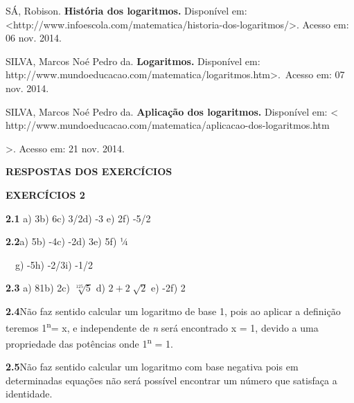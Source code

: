\documentclass[12pt]{article}
\begin{document}
\begin{enumerate}
\setlength{\parskip}{0.0pt}
SÁ, Robison. \textbf{História dos logaritmos. }Disponível em: <http://www.infoescola.com/matematica/historia-dos-logaritmos/>. Acesso em: 06 nov. 2014.\par

SILVA, Marcos Noé Pedro da. \textbf{Logaritmos. }Disponível em: http://www.mundoeducacao.com/matematica/logaritmos.htm>.\  Acesso em: 07 nov. 2014.\par

SILVA, Marcos Noé Pedro da. \textbf{Aplicação dos logaritmos. }Disponível em: < http://www.mundoeducacao.com/matematica/aplicacao-dos-logaritmos.htm\par

>. Acesso em: 21 nov. 2014.\par


\vspace{\baselineskip}
\setlength{\parskip}{8.04pt}

\vspace{\baselineskip}
\textbf{RESPOSTAS DOS EXERCÍCIOS}\par


\vspace{\baselineskip}

\vspace{\baselineskip}
\textbf{EXERCÍCIOS 2}\par

\textbf{2.1 \tab }a) 3\tab \tab b) 6\tab \tab c) 3/2\tab \tab d) -3 \tab \tab e) 2\tab \tab f) -5/2\par

\textbf{2.2\tab }a) 5\tab \tab b) -4\tab \tab c) -2\tab \tab d) 3\tab \tab e) 5\tab \tab f) ¼\par

\ \  \tab g) -5\tab \tab h) -2/3\tab \tab i) -1/2\par

\textbf{2.3 \tab }a) 81\tab \tab b) 2\tab \tab c)  \( \sqrt[125]{5} \) \tab d)  \( 2+2\sqrt[]{2} \) \tab e) -2\tab \tab f) 2\par

\textbf{2.4\tab }Não faz sentido calcular um logaritmo de base 1, pois ao aplicar a definição teremos 1\textsuperscript{n}= x, e independente de \textit{n} será encontrado x = 1, devido a uma propriedade das potências onde 1\textsuperscript{n }= 1.\par

\textbf{2.5\tab }Não faz sentido calcular um logaritmo com base negativa pois em determinadas equações não será possível encontrar um número que satisfaça a identidade.\par


\end{enumerate}
\end{document}

